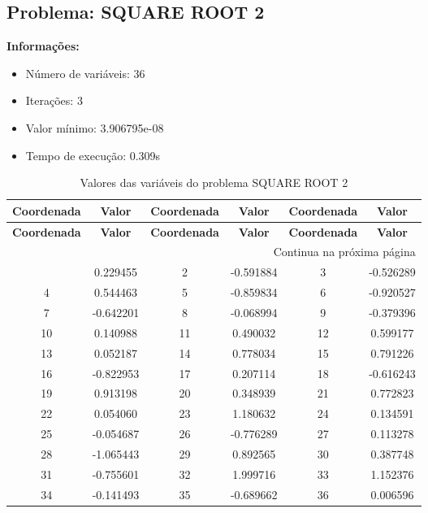 \documentclass[12pt]{article}
\begin{document}
\newpage            
\subsection{Problema: SQUARE ROOT 2}

\textbf{Informações:}
\begin{itemize}
\item Número de variáveis: 36
\item Iterações: 3
\item Valor mínimo: 3.906795e-08
\item Tempo de execução: 0.309s
\end{itemize}

\small
\begin{longtable}{@{}cc|cc|cc@{}}
\caption{Valores das variáveis do problema SQUARE ROOT 2} \\
\toprule
\textbf{Coordenada} & \textbf{Valor} & \textbf{Coordenada} & \textbf{Valor} & \textbf{Coordenada} & \textbf{Valor} \\
\midrule
\endfirsthead

\toprule
\textbf{Coordenada} & \textbf{Valor} & \textbf{Coordenada} & \textbf{Valor} & \textbf{Coordenada} & \textbf{Valor} \\
\midrule
\endhead

\midrule \multicolumn{6}{r}{{Continua na próxima página}} \\ \midrule
\endfoot

\bottomrule
\endlastfoot
1 & 0.229455 & 2 & -0.591884 & 3 & -0.526289 \\
4 & 0.544463 & 5 & -0.859834 & 6 & -0.920527 \\
7 & -0.642201 & 8 & -0.068994 & 9 & -0.379396 \\
10 & 0.140988 & 11 & 0.490032 & 12 & 0.599177 \\
13 & 0.052187 & 14 & 0.778034 & 15 & 0.791226 \\
16 & -0.822953 & 17 & 0.207114 & 18 & -0.616243 \\
19 & 0.913198 & 20 & 0.348939 & 21 & 0.772823 \\
22 & 0.054060 & 23 & 1.180632 & 24 & 0.134591 \\
25 & -0.054687 & 26 & -0.776289 & 27 & 0.113278 \\
28 & -1.065443 & 29 & 0.892565 & 30 & 0.387748 \\
31 & -0.755601 & 32 & 1.999716 & 33 & 1.152376 \\
34 & -0.141493 & 35 & -0.689662 & 36 & 0.006596 \\

\end{longtable}
\end{document}
